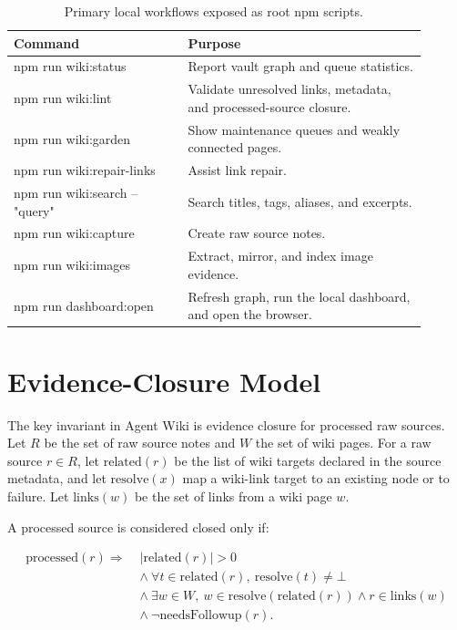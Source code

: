 \documentclass[11pt]{article}
\begin{document}
\begin{table}[t]
\centering
\begin{tabular}{>{\ttfamily}p{0.38\linewidth}p{0.52\linewidth}}
\toprule
\normalfont Command & Purpose \\
\midrule
npm run wiki:status & Report vault graph and queue statistics. \\
npm run wiki:lint & Validate unresolved links, metadata, and processed-source closure. \\
npm run wiki:garden & Show maintenance queues and weakly connected pages. \\
npm run wiki:repair-links & Assist link repair. \\
npm run wiki:search -- "query" & Search titles, tags, aliases, and excerpts. \\
npm run wiki:capture & Create raw source notes. \\
npm run wiki:images & Extract, mirror, and index image evidence. \\
npm run dashboard:open & Refresh graph, run the local dashboard, and open the browser. \\
\bottomrule
\end{tabular}
\caption{Primary local workflows exposed as root npm scripts.}
\label{tab:commands}
\end{table}

\section{Evidence-Closure Model}

The key invariant in Agent Wiki is evidence closure for processed raw sources.
Let $R$ be the set of raw source notes and $W$ the set of wiki pages. For a raw
source $r \in R$, let $\mathrm{related}(r)$ be the list of wiki targets declared
in the source metadata, and let $\mathrm{resolve}(x)$ map a wiki-link target to
an existing node or to failure. Let $\mathrm{links}(w)$ be the set of links
from a wiki page $w$.

A processed source is considered closed only if:

\[
\begin{aligned}
\mathrm{processed}(r) \Rightarrow\;&
|\mathrm{related}(r)| > 0\\
&\land\ \forall t \in \mathrm{related}(r),\ \mathrm{resolve}(t) \neq \bot\\
&\land\ \exists w \in W,\ w \in \mathrm{resolve}(\mathrm{related}(r))
\land r \in \mathrm{links}(w)\\
&\land\ \neg \mathrm{needsFollowup}(r).
\end{aligned}
\]
\end{document}
